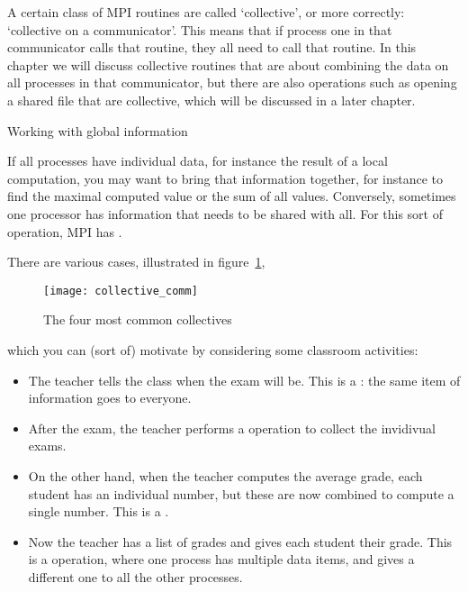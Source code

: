 
A certain class of MPI routines are called `collective', or more correctly:
`collective on a communicator'.
This means that if process one in that communicator calls that routine,
they all need to call that routine.
In this chapter we will discuss collective routines
that are about combining the data on all processes
in that communicator,
but there are also operations such as opening a shared file
that are collective, which will be discussed in a later chapter.

 {Working with global information}
\label{sec:collective}

If all processes have individual data, for instance the result
of a local computation, you may want to bring that information
together, for instance to find the maximal computed value
or the sum of all values. Conversely, sometimes one processor has
information that needs to be shared with all.
For this sort of operation, MPI
has .

There are various cases, illustrated in figure~\ref{fig:collectives},
\begin{figure}[ht]
  \texttt{[image: collective\_comm]}  
  \caption{The four most common collectives}
  \label{fig:collectives}
\end{figure}
which you can (sort of) motivate by considering some classroom activities:
\begin{itemize}
\item The teacher tells the class when the exam will be. This is a
  : the same item of information goes to everyone.
\item After the exam, the teacher performs a 
  operation to collect the invidivual exams.
\item On the other hand, when the teacher computes the average grade,
  each student has an individual number, but these are now combined to
  compute a single number. This is a .
\item Now the teacher has a list of grades and gives each student their
  grade. This is a  operation, where one process
  has multiple data items, and gives a different one to all the other
  processes.
\end{itemize}

